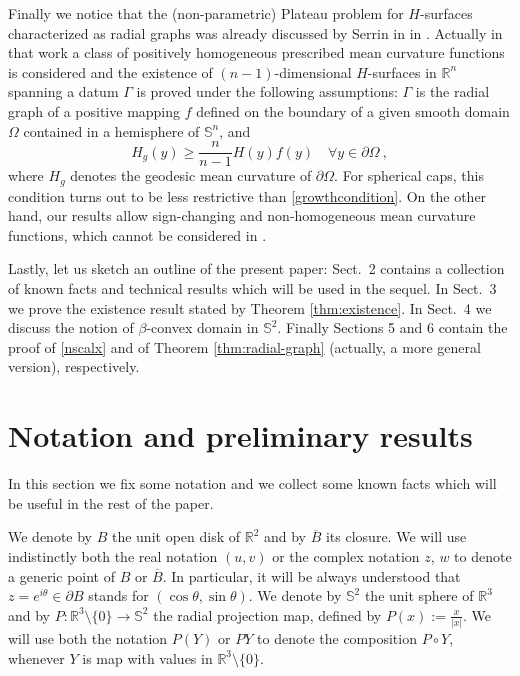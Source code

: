 \documentclass[a4paper,reqno,10pt,oneside]{amsart}
\numberwithin{equation}{section}
\begin{document}
  
  
 

Finally we notice that the (non-parametric) Plateau problem for $H$-surfaces characterized as radial graphs was already discussed by Serrin in in \cite{Serrin2}. Actually in that work a class of positively homogeneous prescribed mean curvature functions is considered and the existence of $(n-1)$-dimensional $H$-surfaces in ${\mathbb R}^n$ spanning a datum $\Gamma$ is proved under the following assumptions: $\Gamma$ is the radial graph of a positive mapping $f$ defined on the boundary of a given smooth domain $\Omega$ contained in a hemisphere of $\mathbb{S}^n$, and  
$$
H_g(y) \geq \frac{n}{n-1} H(y) f(y)\quad\forall y \in \partial \Omega~\!,
$$
where $H_g$ denotes the geodesic mean curvature of $\partial \Omega$.
For spherical caps, this condition turns out to be less restrictive than \eqref{growthcondition}. On the other hand, our results allow sign-changing and non-homogeneous mean curvature functions, which cannot be considered in \cite{Serrin2}.

Lastly, let us sketch an outline of the present paper: Sect.~2 contains a collection of known facts and technical results which will be used in the sequel. In Sect.~3 we prove the existence result stated by Theorem \ref{thm:existence}. In Sect.~4 we discuss the notion of $\beta$-convex domain in $\mathbb{S}^{2}$. Finally Sections 5 and 6 contain the proof of \eqref{nscalx} and of Theorem \ref{thm:radial-graph} (actually, a more general version), respectively. 

\section{Notation and preliminary results}
In this section we fix some notation and we collect some known facts which will be useful in the rest of the paper.

We denote by $B$ the unit open disk of ${\mathbb R}^2$ and by $\overline{B}$ its closure. 
 We will use indistinctly both the real notation $(u,v)$ or the complex notation $z$, $w$ to denote a generic point of $B$ or $\overline{B}$. In particular, it will be always understood that $z=e^{i \theta} \in \partial B$ stands for $(\cos \theta, \sin \theta)$. We denote by $\mathbb{S}^2$ the unit sphere of ${\mathbb R}^3$ and by $P\colon{\mathbb R}^3\setminus\{0\} \to \mathbb{S}^2$ the radial projection map, defined by $P(x):=\frac{x}{|x|}$. We will use both the notation $P(Y)$ or $PY$ to denote the composition $P\circ Y$, whenever $Y$ is map with values in ${\mathbb R}^3\setminus\{0\}$.\\%
 
\end{document}
